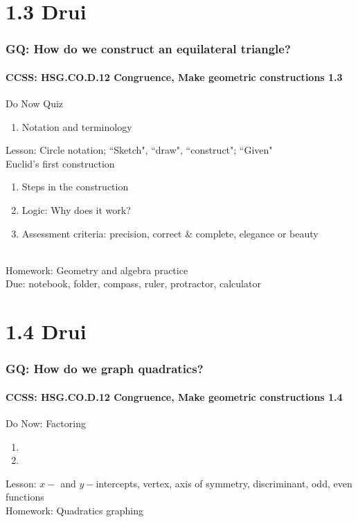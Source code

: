 \documentclass{beamer}
\begin{document}
  \section{1.3 Drui}
  \frame
  {
    \frametitle{GQ: How do we construct an equilateral triangle?}
    \framesubtitle{CCSS: HSG.CO.D.12 Congruence, Make geometric constructions \qquad \alert{1.3}}

    \begin{block}{Do Now Quiz}
    \begin{enumerate}
        \item Notation and terminology
    \end{enumerate}
    \end{block}
    Lesson: Circle notation; ``Sketch", ``draw", ``construct"; ``Given"\\[5pt]
    Euclid's first construction
    \begin{enumerate}
        \item Steps in the construction
        \item Logic: Why does it work?
        \item Assessment criteria: precision, correct \& complete, elegance or beauty
    \end{enumerate}
    \\%
    Homework: Geometry and algebra practice\\
    Due: notebook, folder, compass, ruler, protractor, calculator
  }

  \section{1.4 Drui}
  \frame
  {
    \frametitle{GQ: How do we graph quadratics?}
    \framesubtitle{CCSS: HSG.CO.D.12 Congruence, Make geometric constructions  \qquad \alert{1.4}}

    \begin{block}{Do Now: Factoring}
    \begin{enumerate}
        \item
        \item
    \end{enumerate}
    \end{block}
    Lesson: $x-$ and $y-$intercepts, vertex, axis of symmetry, discriminant, odd, even functions
    \\%
    Homework: Quadratics graphing
  }
\end{document}
